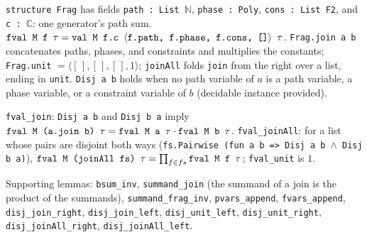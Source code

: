 \begin{definition}[Fragments]\label{def:lean-pathsum-frag}
\textnormal{\texttt{structure Frag}} has fields \textnormal{\texttt{path : List \ensuremath{\mathbb{N}}}}, \textnormal{\texttt{phase : Poly}}, \textnormal{\texttt{cons : List F2}},
and \textnormal{\texttt{c : \ensuremath{\mathbb{C}}}}: one generator's path sum. $\textnormal{\texttt{fval M f \ensuremath{\tau}}} = \textnormal{\texttt{val M f.\allowbreak{}c \ensuremath{\langle}f.\allowbreak{}path,\allowbreak{} f.\allowbreak{}phase,\allowbreak{} f.\allowbreak{}cons,\allowbreak{} []\ensuremath{\rangle} \ensuremath{\tau}}}$.
\textnormal{\texttt{Frag.\allowbreak{}join a b}} concatenates paths, phases, and constraints and multiplies the constants;
\textnormal{\texttt{Frag.\allowbreak{}unit}} $=\langle[\,],[\,],[\,],1\rangle$; \textnormal{\texttt{joinAll}} folds \textnormal{\texttt{join}} from the right
over a list, ending in \textnormal{\texttt{unit}}. \textnormal{\texttt{Disj a b}} holds when no path variable of $a$ is a path
variable, a phase variable, or a constraint variable of $b$ (decidable instance provided).
\end{definition}

\begin{theorem}
\textnormal{\texttt{fval\_\allowbreak{}join}}: \textnormal{\texttt{Disj a b}} and \textnormal{\texttt{Disj b a}} imply
$\textnormal{\texttt{fval M (\allowbreak{}a.\allowbreak{}join b) \ensuremath{\tau}}} = \textnormal{\texttt{fval M a \ensuremath{\tau}}} \cdot \textnormal{\texttt{fval M b \ensuremath{\tau}}}$.
\textnormal{\texttt{fval\_\allowbreak{}joinAll}}: for a list whose pairs are disjoint both ways
(\textnormal{\texttt{fs.\allowbreak{}Pairwise (\allowbreak{}fun a b => Disj a b \ensuremath{\wedge} Disj b a)}}),
$\textnormal{\texttt{fval M (\allowbreak{}joinAll fs) \ensuremath{\tau}}} = \prod_{f\in fs}\textnormal{\texttt{fval M f \ensuremath{\tau}}}$; \textnormal{\texttt{fval\_\allowbreak{}unit}} is $1$.
\end{theorem}
\noindent Supporting lemmas: \textnormal{\texttt{bsum\_\allowbreak{}inv}}, \textnormal{\texttt{summand\_\allowbreak{}join}} (the summand of a join is the
product of the summands), \textnormal{\texttt{summand\_\allowbreak{}frag\_\allowbreak{}inv}}, \textnormal{\texttt{pvars\_\allowbreak{}append}}, \textnormal{\texttt{fvars\_\allowbreak{}append}},
\textnormal{\texttt{disj\_\allowbreak{}join\_\allowbreak{}right}}, \textnormal{\texttt{disj\_\allowbreak{}join\_\allowbreak{}left}}, \textnormal{\texttt{disj\_\allowbreak{}unit\_\allowbreak{}left}}, \textnormal{\texttt{disj\_\allowbreak{}unit\_\allowbreak{}right}},
\textnormal{\texttt{disj\_\allowbreak{}joinAll\_\allowbreak{}right}}, \textnormal{\texttt{disj\_\allowbreak{}joinAll\_\allowbreak{}left}}.

